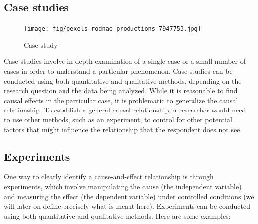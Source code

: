 \documentclass[
  12pt,
  oneside]{book}
\theoremstyle{definition}
\theoremstyle{definition}
\theoremstyle{definition}
\theoremstyle{definition}
\theoremstyle{remark}
\begin{document}
\hypertarget{case-studies}{%
\subsection{Case studies}\label{case-studies}}

\begin{figure}
\centering
\texttt{[image: fig/pexels-rodnae-productions-7947753.jpg]}
\caption[\label{fig:casestudy} Case study]{\label{fig:casestudy} Case study\footnotemark{}}
\end{figure}

Case studies involve in-depth examination of a single case or a small number of cases in order to understand a particular phenomenon. Case studies can be conducted using both quantitative and qualitative methods, depending on the research question and the data being analyzed. While it is reasonable to find causal effects in the particular case, it is problematic to generalize the causal relationship. To establish a general causal relationship, a researcher would need to use other methods, such as an experiment, to control for other potential factors that might influence the relationship that the respondent does not see.

\hypertarget{experiments}{%
\subsection{Experiments}\label{experiments}}

One way to clearly identify a cause-and-effect relationship is through experiments, which involve manipulating the cause (the independent variable) and measuring the effect (the dependent variable) under controlled conditions (we will later on define precisely what is meant here). Experiments can be conducted using both quantitative and qualitative methods. Here are some examples:
\end{document}
